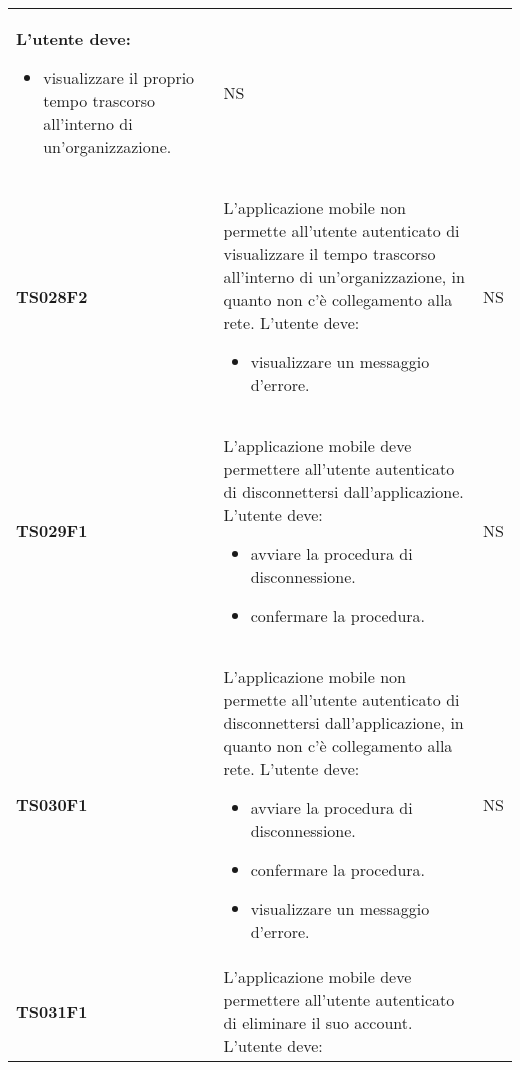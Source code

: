 \documentclass[../piano-di-qualifica.tex]{subfiles}
\begin{document}
\begin{centering}
\begin{longtable}[H]{>{\centering\bfseries}m{3cm} >{}p{10cm} >{\centering\arraybackslash}m{3cm}}
                      L'utente deve:
                      \begin{itemize}
                        \item visualizzare il proprio tempo trascorso all'interno di un'organizzazione.
                      \end{itemize}
                    & NS \\
        TS028F2     & L'applicazione mobile non permette all'utente autenticato di visualizzare il tempo trascorso all'interno di un'organizzazione, in quanto non c'è collegamento alla rete. \newline
                      L'utente deve:
                      \begin{itemize}
                        \item visualizzare un messaggio d'errore.
                      \end{itemize}
                    & NS \\
        TS029F1     & L'applicazione mobile deve permettere all'utente autenticato di disconnettersi dall'applicazione. \newline
                      L'utente deve:
                      \begin{itemize}
                        \item avviare la procedura di disconnessione.
                        \item confermare la procedura.
                      \end{itemize}
                    & NS \\
        TS030F1     & L'applicazione mobile non permette all'utente autenticato di disconnettersi dall'applicazione, in quanto non c'è collegamento alla rete. \newline
                      L'utente deve:
                      \begin{itemize}
                        \item avviare la procedura di disconnessione.
                        \item confermare la procedura.
                        \item visualizzare un messaggio d'errore.
                      \end{itemize}
                    & NS \\
        TS031F1     & L'applicazione mobile deve permettere all'utente autenticato di eliminare il suo account. \newline
                      L'utente deve:

\end{longtable}
\end{centering}
\end{document}
